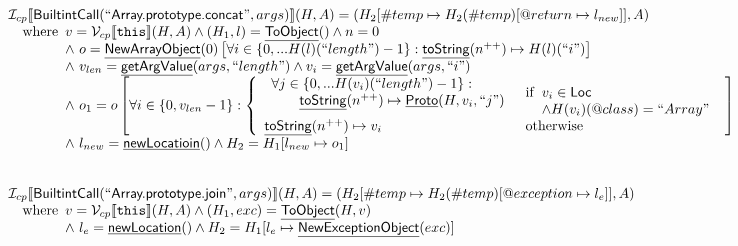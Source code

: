 \documentclass{article}
\makeatletter
\newcommand{\SF}[1]{\mbox{\textsf{#1}}}
\newcommand{\TT}[1]{\mbox{\texttt{#1}}}
\newcommand{\wherec}[1]{{\rm where}\begin{array}[t]{l}#1\end{array}}
\newcommand{\ifc}[1]{{\rm if}\begin{array}[t]{l}#1\end{array}}
\newcommand{\owc}{{\rm otherwise}}
\newcommand{\I}{\mathcal{I}}
\newcommand{\V}{\mathcal{V}}
\newcommand{\lbr}{\llbracket}
\newcommand{\rbr}{\rrbracket}
\newcommand{\hf}[1]{\underline{\sf #1}}
\newcommand{\varloc}[1]{\##1}
\newcommand{\varprop}[1]{@#1}
\makeatother
\begin{document}
\[\begin{array}{l}
\I _{cp}\lbr \SF{BuiltintCall}(``\SF{Array.prototype.concat}",args)\rbr(H,A)
 = (H_2[\varloc{temp}\mapsto H_2(\varloc{temp})[\varprop{return}\mapsto l_{new}]], A) \\
\quad\wherec{
  v = \V _{cp}\lbr \TT{this}\rbr (H,A) \land (H_1,l) = \hf{ToObject}()
  \land n = 0\\
  \land\ o = \hf{NewArrayObject}(0)\left[
        \forall i \in \{0,... H(l)(``length") -1\}:\hf{toString}(n^{++}) \mapsto H(l)(``i")\right]\\
  \land\ v_{len} = \hf{getArgValue}(args, ``length") \land v_i = \hf{getArgValue}(args, ``i")\\
  \land\ o_1 = o\left[\forall i \in \{0, v_{len} - 1\}:
    \left\{\begin{array}{ll}
      \begin{array}{l}
        \forall j \in \{0,... H(v_i)(``length") -1\}:\\
        \quad\quad\hf{toString}(n^{++}) \mapsto \hf{Proto}(H,v_i,``j")
      \end{array}
      & \ifc{v_i \in \SF{Loc}\\ \land H(v_i)(@class) = ``Array"}\\
      \hf{toString}(n^{++}) \mapsto v_i & \owc
    \end{array}\right.
  \right]\\
  \land\ l_{new} = \hf{newLocatioin}() \land H_2 = H_1[l_{new} \mapsto o_1]
  }\\
\\\\



\I _{cp}\lbr \SF{BuiltintCall}(``\SF{Array.prototype.join}",args)\rbr(H,A)
 = (H_2[\varloc{temp}\mapsto H_2(\varloc{temp})[\varprop{exception}\mapsto l_e]], A) \\
\quad\wherec{
  v = \V _{cp}\lbr \TT{this}\rbr (H,A) \land (H_1,exc) = \hf{ToObject}(H,v)\\
  \land\ l_e = \hf{newLocation}() \land H_2=H_1[l_e\mapsto\hf{NewExceptionObject}(exc)] 
  }\\
  

\end{array}\]
\end{document}

